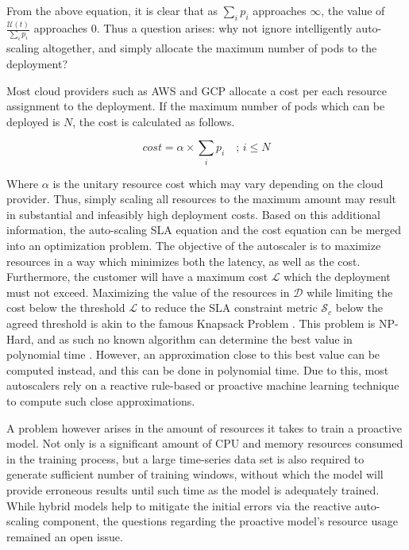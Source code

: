 From the above equation, it is clear that as $\sum_{i} p_{i}$ approaches $\infty$, the value of $\frac{\mathcal{U}(t)}{\sum_{i} p_{i}}$ approaches 0. Thus a question arises: why not ignore intelligently auto-scaling altogether, and simply allocate the maximum number of pods to the deployment?\par

Most cloud providers such as AWS and GCP allocate a cost per each resource assignment to the deployment. If the maximum number of pods which can be deployed is $N$, the cost is calculated as follows.

\begin{equation}
    cost = \alpha \times \sum_{i} p_{i} \quad ;\,i \le N
\end{equation}

Where $\alpha$ is the unitary resource cost which may vary depending on the cloud provider. Thus, simply scaling all resources to the maximum amount may result in substantial and infeasibly high deployment costs. Based on this additional information, the auto-scaling SLA equation and the cost equation can be merged into an optimization problem. The objective of the autoscaler is to maximize resources in a way which minimizes both the latency, as well as the cost. Furthermore, the customer will have a maximum cost $\mathcal{L}$ which the deployment must not exceed. Maximizing the value of the resources in $\mathcal{D}$ while limiting the cost below the threshold $\mathcal{L}$ to reduce the SLA constraint metric $\mathcal{S}_{c}$ below the agreed threshold is akin to the famous Knapsack Problem \cite{kellerer2004introduction}. This problem is NP-Hard, and as such no known algorithm can determine the best value in polynomial time \cite{martello1987algorithms}. However, an approximation close to this best value can be computed instead, and this can be done in polynomial time. Due to this, most autoscalers rely on a reactive rule-based or proactive machine learning technique to compute such close approximations.\par

A problem however arises in the amount of resources it takes to train a proactive model. Not only is a significant amount of CPU and memory resources consumed in the training process, but a large time-series data set is also required to generate sufficient number of training windows, without which the model will provide erroneous results until such time as the model is adequately trained. While hybrid models help to mitigate the initial errors via the reactive auto-scaling component, the questions regarding the proactive model's resource usage remained an open issue.\par

